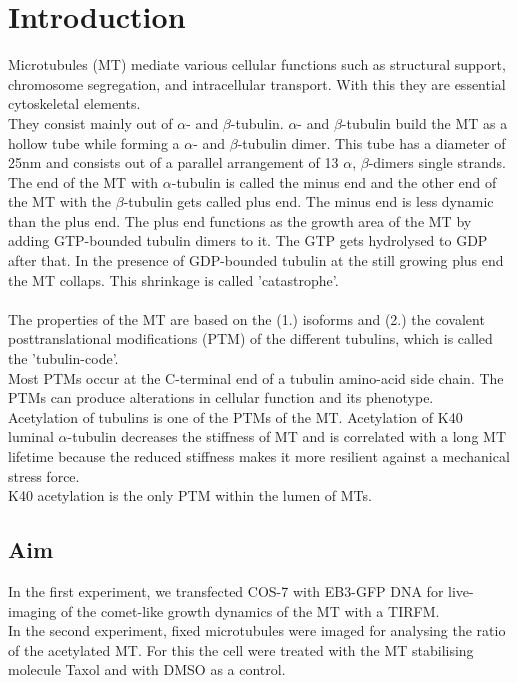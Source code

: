 \pagestyle{headings}
\setcounter{page}{1}

\section{Introduction}

Microtubules (MT) mediate various cellular functions such as structural support, chromosome segregation, and intracellular transport. With this they are essential cytoskeletal elements. \\
They consist mainly out of $\alpha$- and $\beta$-tubulin. 
$\alpha$- and $\beta$-tubulin build the MT as a hollow tube while forming a $\alpha$- and $\beta$-tubulin dimer. This tube has a diameter of 25nm and consists out of a parallel arrangement of 13 $\alpha$, $\beta$-dimers single strands. The end of the MT with $\alpha$-tubulin is called the minus end and the other end of the MT with the $\beta$-tubulin gets called plus end. The minus end is less dynamic than the plus end. The plus end functions as the growth area of the MT by adding GTP-bounded tubulin dimers to it. The GTP gets hydrolysed to GDP after that. In the presence of GDP-bounded tubulin at the still growing plus end the MT collaps. This shrinkage is called 'catastrophe'. \\\\
The properties of the MT are based on the (1.) isoforms and (2.) the covalent posttranslational modifications (PTM) of the different tubulins, which is called the 'tubulin-code'.\\
Most PTMs occur at the C-terminal end of a tubulin amino-acid side chain. The PTMs can produce alterations in cellular function and its phenotype.\\
Acetylation of tubulins is one of the PTMs of the MT. Acetylation of K40 luminal $\alpha $-tubulin decreases the stiffness of MT and is correlated with a long MT lifetime because the reduced stiffness makes it more resilient against a mechanical stress force. \\
K40 acetylation is the only PTM within the lumen of MTs. 




\subsection{Aim}
In the first experiment, we transfected COS-7 with EB3-GFP DNA for live-imaging of the comet-like growth dynamics of the MT with a TIRFM.\\
In the second experiment, fixed microtubules were imaged for analysing the ratio of the acetylated MT. For this the cell were treated with the MT stabilising molecule Taxol and with DMSO as a control.